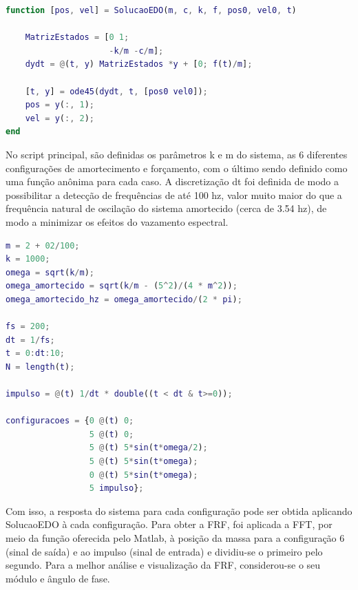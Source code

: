 \documentclass[12pt,a4paper]{article}
\begin{document}
\begin{lstlisting}[language=Matlab, 
caption = {Função para solução do caso geral},
label = {lst:SolucaoEDO}]
function [pos, vel] = SolucaoEDO(m, c, k, f, pos0, vel0, t)

    MatrizEstados = [0 1;
                     -k/m -c/m];
    dydt = @(t, y) MatrizEstados *y + [0; f(t)/m];
    
    [t, y] = ode45(dydt, t, [pos0 vel0]);
    pos = y(:, 1);
    vel = y(:, 2);
end
\end{lstlisting}

\par No script principal, são definidas os parâmetros k e m do sistema, as 6 diferentes configurações de amortecimento e forçamento, com o último sendo definido como uma função anônima para cada caso. A discretização dt foi definida de modo a possibilitar a detecção de frequências de até 100 hz, valor muito maior do que a frequência natural de oscilação do sistema amortecido (cerca de 3.54 hz), de modo a minimizar os efeitos do vazamento espectral.

\begin{lstlisting}[language=Matlab, 
caption = {Definição dos parâmetros e configurações},
label = {lst:SolucaoEDO}]
m = 2 + 02/100;
k = 1000;
omega = sqrt(k/m);
omega_amortecido = sqrt(k/m - (5^2)/(4 * m^2));
omega_amortecido_hz = omega_amortecido/(2 * pi);

fs = 200;
dt = 1/fs;
t = 0:dt:10;
N = length(t);

impulso = @(t) 1/dt * double((t < dt & t>=0));

configuracoes = {0 @(t) 0;
                 5 @(t) 0;
                 5 @(t) 5*sin(t*omega/2);
                 5 @(t) 5*sin(t*omega);
                 0 @(t) 5*sin(t*omega);
                 5 impulso};
\end{lstlisting}
\par Com isso, a resposta do sistema para cada configuração pode ser obtida aplicando SolucaoEDO à cada configuração. Para obter a FRF, foi aplicada a FFT, por meio da função oferecida pelo Matlab, à posição da massa para a configuração 6 (sinal de saída) e ao impulso (sinal de entrada) e dividiu-se o primeiro pelo segundo. Para a melhor análise e visualização da FRF, considerou-se o seu módulo e ângulo de fase.
\end{document}
